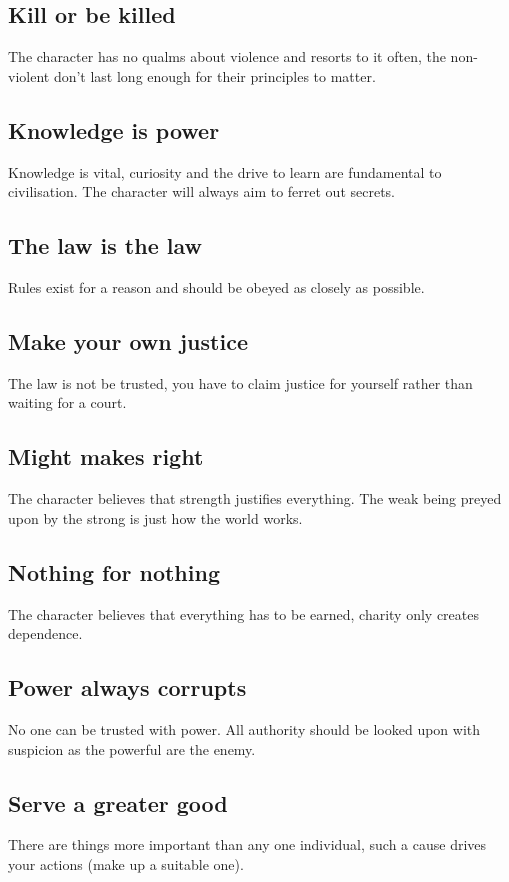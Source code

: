 \documentclass[a4paper,10pt,oneside]{book}
\begin{document}
\subsection{Kill or be killed}
The character has no qualms about violence and resorts to it often, the non-violent don't last long enough for their principles to matter.

\subsection{Knowledge is power}
Knowledge is vital, curiosity and the drive to learn are fundamental to civilisation. The character will always aim to ferret out secrets.

\subsection{The law is the law}
Rules exist for a reason and should be obeyed as closely as possible.

\subsection{Make your own justice}
The law is not be trusted, you have to claim justice for yourself rather than waiting for a court. 

\subsection{Might makes right}
The character believes that strength justifies everything. The weak being preyed upon by the strong is just how the world works. 

\subsection{Nothing for nothing}
The character believes that everything has to be earned, charity only creates dependence.

\subsection{Power always corrupts}
No one can be trusted with power. All authority should be looked upon with suspicion as the powerful are the enemy.

\subsection{Serve a greater good}
There are things more important than any one individual, such a cause drives your actions (make up a suitable one).
\end{document}
